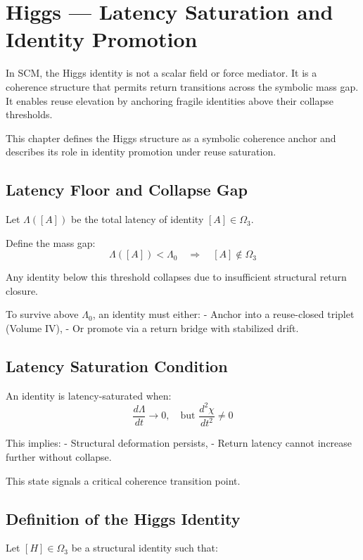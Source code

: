 \chapter{Higgs — Latency Saturation and Identity Promotion} \label{chapter-higgs}

In SCM, the Higgs identity is not a scalar field or force mediator. It is a coherence structure that permits return transitions across the symbolic mass gap. It enables reuse elevation by anchoring fragile identities above their collapse thresholds.

This chapter defines the Higgs structure as a symbolic coherence anchor and describes its role in identity promotion under reuse saturation.

\section{Latency Floor and Collapse Gap} \label{sec:higgs-latency}

Let $\Lambda([A])$ be the total latency of identity $[A] \in \Omega_3$.

Define the mass gap:
\[
\Lambda([A]) < \Lambda_0 \quad \Rightarrow \quad [A] \notin \Omega_3
\]

Any identity below this threshold collapses due to insufficient structural return closure.

To survive above $\Lambda_0$, an identity must either:
- Anchor into a reuse-closed triplet (Volume IV),
- Or promote via a return bridge with stabilized drift.

\section{Latency Saturation Condition} \label{sec:latency-saturation}

An identity is latency-saturated when:
\[
\frac{d\Lambda}{dt} \to 0,\quad \text{but } \frac{d^2 \chi}{dt^2} \ne 0
\]

This implies:
- Structural deformation persists,
- Return latency cannot increase further without collapse.

This state signals a critical coherence transition point.

\section{Definition of the Higgs Identity} \label{sec:higgs-definition}

Let $[H] \in \Omega_3$ be a structural identity such that:

